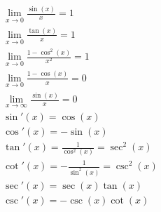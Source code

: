 \documentclass[UTF8,fontset=ubuntu]{ctexart}
\begin{document}
	\begin{gather}
		\lim_{x\to0}\frac{\sin(x)}{x}=1\\
		\lim_{x\to0}\frac{\tan(x)}{x}=1\\
		\lim_{x\to0}\frac{1-\cos^2(x)}{x^2}=1\\
		\lim_{x\to0}\frac{1-\cos(x)}{x}=0\\
		\lim_{x\to\infty}\frac{\sin(x)}{x}=0\\
		\sin'(x)=\cos(x)\\
		\cos'(x)=-\sin(x)\\
		\tan'(x)=\frac{1}{\cos^2(x)}=\sec^2(x)\\
		\cot'(x)=-\frac{1}{\sin^2(x)}=\csc^2(x)\\
		\sec'(x)=\sec(x)\tan(x)\\
		\csc'(x)=-\csc(x)\cot(x)\\
	\end{gather}
\end{document}
